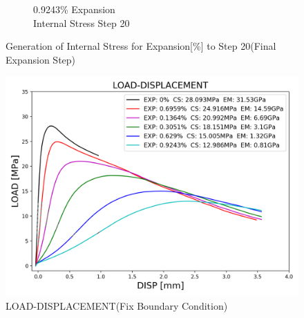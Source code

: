 \begin{figure}[ht!]
\begin{subfigure}{.25\textwidth}
      \caption{0.9243\% Expansion\\Internal Stress Step 20}
    \end{subfigure}

    

\caption{Generation of Internal Stress for Expansion[\%] to Step 20(Final Expansion Step)}
\label{fig:A15_stress}
\end{figure}


\begin{figure}[ht!]
    \centering
    \includegraphics[width=0.8\linewidth]{Files/exp_3D/ASR/S13A15P75FIX-LOAD-DISPLACEMENT.png}
    \caption{LOAD-DISPLACEMENT(Fix Boundary Condition)}
    \label{fig:S13A15P75FIX-LOAD-DISPLACEMENT}
\end{figure}

